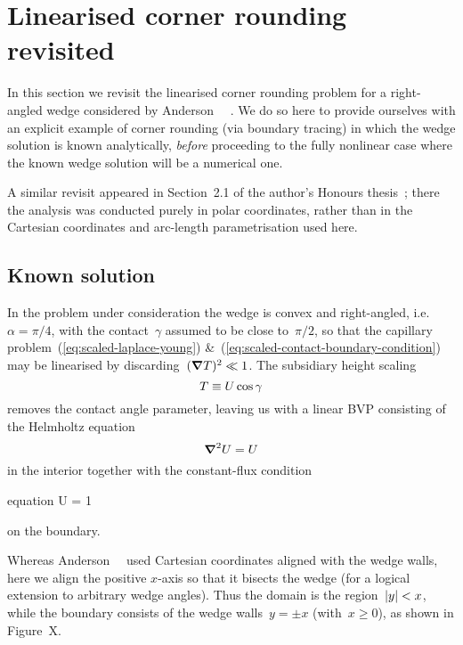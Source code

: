 \section{Linearised corner rounding revisited}
\label{sec:moderate.linearised}

In this section we revisit the linearised corner rounding problem
for a right-angled wedge
considered by Anderson~\etal~%
  \cite{anderson-2007-boundary-tracing-ii-applications}.
We do so here to provide ourselves
with an explicit example of corner rounding (via boundary tracing)
in which the wedge solution is known analytically,
\emph{before} proceeding to the fully nonlinear case
where the known wedge solution will be a numerical one.

A similar revisit appeared in Section~2.1 of
the author's Honours thesis~\cite{li-2017-thesis-rounding-capillary-wedge};
there the analysis was conducted purely in polar coordinates,
rather than in the Cartesian coordinates and arc-length parametrisation
used here.

\subsection{Known solution}
\label{sec:moderate.linearised.known}

In the problem under consideration
the wedge is convex and right-angled, i.e.~$\alpha = \pi/4$,
with the contact~$\gamma$ assumed to be close to~$\pi/2$,
so that the capillary problem~(\ref{eq:scaled-laplace-young})
\&~(\ref{eq:scaled-contact-boundary-condition})
may be linearised by discarding~$(\mathop{}\!\boldsymbol{\mathbf{\nabla}} T)^2 \ll 1$.
The subsidiary height scaling
\begin{equation}
  T \equiv U \cos\gamma
  \label{eq:helmholtz-height-scaling}
\end{equation}
removes the contact angle parameter,
leaving us with a linear BVP consisting of
the Helmholtz equation
\begin{equation}
  \mathop{}\!\boldsymbol{\mathbf{\nabla}}^2 U = U
  \label{eq:scaled-helmholtz}
\end{equation}
in the interior
together with the constant-flux condition
\begin{important}{equation}
  \normalvec \dotp \del U = 1
  \label{eq:scaled-contact-linearised}
\end{important}
on the boundary.

Whereas Anderson~\etal~\cite{anderson-2007-boundary-tracing-ii-applications}
used Cartesian coordinates aligned with the wedge walls,
here we align the positive $x$-axis so that it bisects the wedge
(for a logical extension to arbitrary wedge angles).
Thus the domain is the region~$\lvert y\rvert < x$,
while the boundary consists of the wedge walls~$y = \pm x$ (with~$x \ge 0$),
as shown in Figure~X. %

